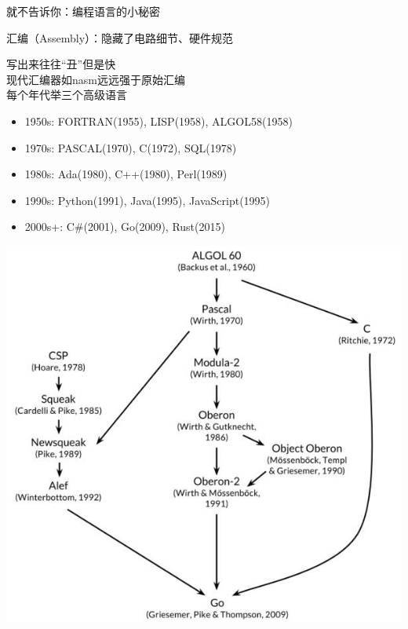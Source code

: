 \documentclass[aspectratio=1610]{beamer}
\begin{document}
\begin{frame}[t]{就不告诉你：编程语言的小秘密}
    \newline
    
    \alert{汇编（Assembly）}：隐藏了电路细节、硬件规范
    \begin{minipage}{0.7\linewidth}
        写出来往往“丑”但是快 \\
        现代汇编器如nasm远远强于原始汇编 \\[1em]
        每个年代举三个高级语言\footnotemark
        \begin{itemize}
            \item 1950s: FORTRAN(1955), LISP(1958), ALGOL58(1958)
            \item 1970s: PASCAL(1970), C(1972), SQL(1978)
            \item 1980s: Ada(1980), C++(1980), Perl(1989)
            \item 1990s: Python(1991), Java(1995), JavaScript(1995)
            \item 2000s+: C\#(2001), Go(2009), Rust(2015)
        \end{itemize}
    \end{minipage}
    \begin{minipage}{0.28\linewidth}
        \centering
        \includegraphics[width=\linewidth]{pic/GoDerivation.png}
    \end{minipage}
\end{frame}
\end{document}
